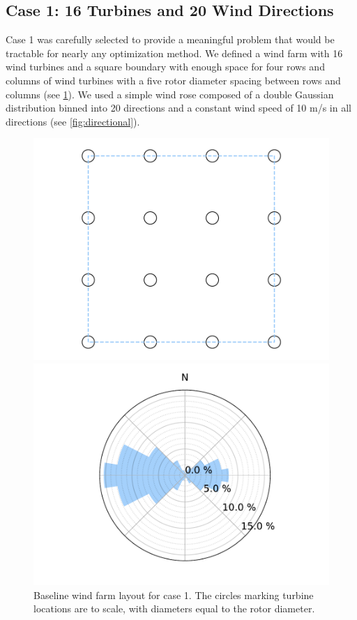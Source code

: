 \documentclass{jpconf}
\begin{document}
\subsection{Case 1: 16 Turbines and 20 Wind Directions}
Case 1 was carefully selected to provide a meaningful problem that would be tractable for nearly any optimization method. We defined a wind farm with 16 wind turbines and a square boundary with enough space for four rows and columns of wind turbines with a five rotor diameter spacing between rows and columns (see \cref{fig:layout1}). We used a simple wind rose composed of a double Gaussian distribution binned into 20 directions and a constant wind speed of 10 m/s in all directions (see \cref{fig:directional}).
\begin{figure}[h!]
\centering
\begin{minipage}[t]{18pc}
\centering
\includegraphics[width=1.\textwidth, trim={1.5cm, 0cm, 1.5cm, 0cm}, clip]{final_images/layouts/16_turb_start.pdf}
\caption{Baseline wind farm layout for case 1. The circles marking turbine locations are to scale, with diameters equal to the rotor diameter.}
\label{fig:layout1}
\end{minipage}\hspace{1pc}%
\begin{minipage}[t]{18pc}
\centering
\includegraphics[width=\textwidth, trim={2.0cm 0cm 2.0cm 0cm}, clip]{final_images/windroses/freqwindrose_20_dir.pdf}

\end{minipage}
\end{figure}
\end{document}
